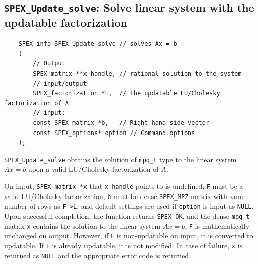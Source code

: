 \documentclass[12pt,oneside]{book}
\theoremstyle{definition}
\begin{document}
{%
\subsection{\texttt{SPEX\_Update\_solve}: Solve linear system with the updatable factorization}\label{ss:SPEX_Update_solve}
\begin{mdframed}[userdefinedwidth=\textwidth]
{\footnotesize
\begin{verbatim}
    SPEX_info SPEX_Update_solve // solves Ax = b
    (
        // Output
        SPEX_matrix **x_handle, // rational solution to the system
        // input/output
        SPEX_factorization *F,  // The updatable LU/Cholesky factorization of A
        // input:
        const SPEX_matrix *b,   // Right hand side vector
        const SPEX_options* option // Command options
    );
\end{verbatim}
} \end{mdframed}

\verb|SPEX_Update_solve| obtains the solution of \verb|mpq_t| type to the
linear system $Ax=b$ upon a valid LU/Cholesky factorization of $A$.

On input, \verb|SPEX_matrix *x| that \verb|x_handle| points to is undefined; \verb|F| must be a valid LU/Cholesky factorization; \verb|b| must be dense \verb|SPEX_MPZ| matrix with same number of rows as \verb|F->L|; and default settings are used if
\verb|option| is input as \verb|NULL|. Upon successful completion, the function returns \verb|SPEX_OK|, and the dense \verb|mpq_t| matrix \verb|x|
contains the solution  to the linear
system $Ax=b$. \verb|F| is mathematically unchanged on output. However, if \verb|F| is non-updatable on input, it is converted to updatable. If \verb|F| is already updatable, it is not modified.
In case of failure, \verb|x| is returned as \verb|NULL| and the appropriate error code is returned.


}
\end{document}
